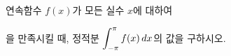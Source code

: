 \hspace*{2mm}\begin{minipage}[t]{\dimexpr\linewidth-2mm\relax}\vspace{0pt}
연속함수 $f(x)$가 모든 실수 $x$에 대하여 \par\smallskip{}\par\smallskip\noindent 을 만족시킬 때, 정적분 $\displaystyle\int_{-\pi}^{\pi}f(x)\mkern3mu dx$의 값을 구하시오.\end{minipage}

